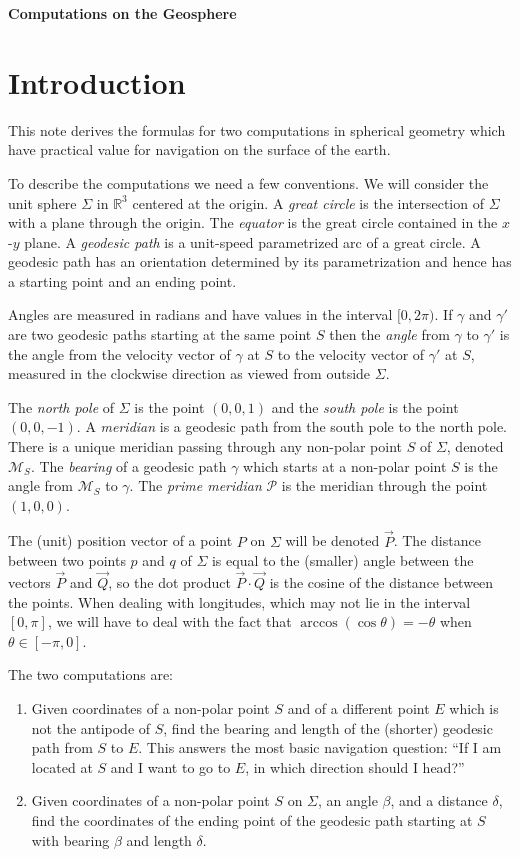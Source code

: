\documentclass[12pt]{article}
\begin{document}
\centerline{\Large\bf Computations on the Geosphere}
\section{Introduction}

This note derives the formulas for two computations in spherical geometry which
have practical value for navigation on the surface of the earth.

To describe the computations we need a few conventions. We will consider the
unit sphere $\Sigma$ in ${\mathbb R}^3$ centered at the origin. A {\it great
  circle} is the intersection of $\Sigma$ with a plane through the origin. The
{\it equator} is the great circle contained in the $x$-$y$ plane. A {\it geodesic path}
is a unit-speed parametrized arc of a great circle. A geodesic path has an
orientation determined by its parametrization and hence has a starting point and
an ending point.

Angles are measured in radians and have values in the interval $[0, 2\pi)$. If
$\gamma$ and $\gamma'$ are two geodesic paths starting at the same point $S$
then the {\it angle} from $\gamma$ to $\gamma'$ is the angle from the velocity
vector of $\gamma$ at $S$ to the velocity vector of $\gamma'$ at $S$, measured in
the clockwise direction as viewed from outside $\Sigma$.

The {\it north pole} of $\Sigma$ is the point $(0, 0, 1)$ and the {\it south
  pole} is the point $(0, 0, -1)$. A {\it meridian} is a geodesic path from the
south pole to the north pole. There is a unique meridian passing through any
non-polar point $S$ of $\Sigma$, denoted $\mathcal{M}_S$. The {\it bearing} of a
geodesic path $\gamma$ which starts at a non-polar point $S$ is the angle from
$\mathcal{M}_S$ to $\gamma$. The {\it prime meridian} $\mathcal P$ is the
meridian through the point $(1, 0, 0)$.

The (unit) position vector of a point $P$ on $\Sigma$ will be denoted
$\vec{P}$.  The distance between two points $p$ and $q$ of $\Sigma$ is
equal to the (smaller) angle between the vectors $\vec{P}$ and
$\vec{Q}$, so the dot product $\vec{P}\cdot \vec{Q}$ is the cosine of
the distance between the points.  When dealing with longitudes, which
may not lie in the interval $[0, \pi]$, we will have
to deal with the fact that $\arccos(\cos \theta) = -\theta$ when
$\theta\in [-\pi, 0]$.

The two computations are:
\begin{enumerate}[label={(\arabic*)}]
\item Given coordinates of a non-polar point $S$ and of a different point $E$
  which is not the antipode of $S$, find the bearing and length of the (shorter)
  geodesic path from $S$ to $E$.  This answers the most basic navigation
  question: ``If I am located at $S$ and I want to go to $E$, in which direction
  should I head?''
\item Given coordinates of a non-polar point $S$ on $\Sigma$, an angle
  $\beta$, and a distance $\delta$, find the coordinates of the ending point of the
  geodesic path starting at $S$ with bearing $\beta$ and length $\delta$.
\end{enumerate}
\end{document}

